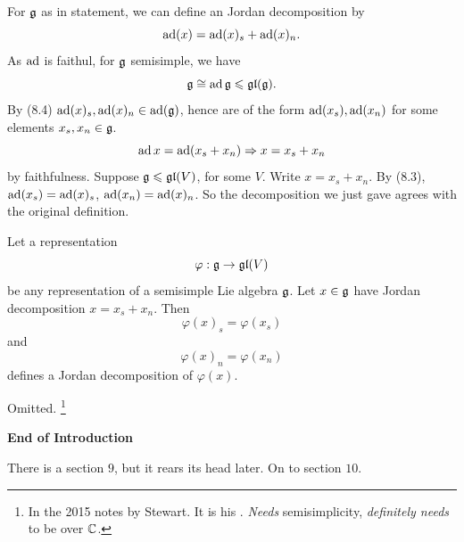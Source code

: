 \documentclass{article}
\begin{document}
\endproof
For $\mathfrak{g}$ as in statement, we can define an  Jordan decomposition by \[ \operatorname{ad}(x) = \operatorname{ad}(x)_{s} + \operatorname{ad}(x)_{n}.\]
As $\operatorname{ad}$ is faithul, for $\mathfrak{g}$ semisimple, we have \[ \mathfrak{g} \cong \operatorname{ad} \mathfrak{g} \leqslant \mathfrak{gl}(\mathfrak{g}).\] By (8.4) $\operatorname{ad}(x)_{s}, \operatorname{ad}(x)_{n} \in \operatorname{ad}(\mathfrak{g})$, hence are of the form $\operatorname{ad}(x_{s}), \operatorname{ad}(x_{n})$ for some elements $x_{s}, x_{n} \in \mathfrak{g}$. \[ \operatorname{ad} x = \operatorname{ad} (x_{s} + x_{n}) \Rightarrow x = x_{s}+x_{n}\] by faithfulness.\gap 
Suppose $\mathfrak{g} \leqslant \mathfrak{gl}(V)$, for some $V$. Write $x=x_{s}+x_{n}$. By (8.3), $\operatorname{ad}(x_{s})=\operatorname{ad}(x)_{s}$, $\operatorname{ad}(x_{n}) = \operatorname{ad}(x)_{n}$. 
So the  decomposition we just gave agrees with the original definition.
\begin{corr}{}
    Let a representation \[ \varphi : \mathfrak{g} \to \mathfrak{gl}(V) \] be any representation of a semisimple Lie algebra $\mathfrak{g}$. Let $x \in \mathfrak{g}$ have Jordan decomposition $x=x_{s}+x_{n}$. Then \[ \varphi(x)_{s}=\varphi(x_{s})\] and \[ \varphi(x)_{n} = \varphi(x_{n})\] defines a Jordan decomposition of $\varphi(x)$.
\end{corr}
\proof Omitted. \footnote{In the 2015 notes by Stewart. It is his . \textit{Needs} semisimplicity, \textit{definitely needs} to be over $\mathbb{C}$.}
\begin{center} \large \textbf{End of Introduction} \normalsize \end{center}
There is a section $9$, but it rears its head later. On to section $10$.
\setcounter{section}{9}
\end{document}
